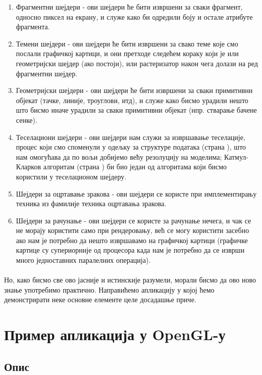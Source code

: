 \documentclass[12pt]{article}
\begin{document}
	\begin{enumerate}
	\item Фрагментни шејдери - ови шејдери ће бити извршени за сваки фрагмент, односно пиксел на екрану, и служе како би одредили боју и остале атрибуте фрагмента.
	\item Темени шејдери - ови шејдери ће бити извршени за свако теме које смо послали графичкој картици, и они претходе следећем кораку који је или геометријски шејдер (ако постоји), или растеризатор након чега долази на ред фрагментни шејдер.
	\item Геометријски шејдери - ови шејдери ће бити извршени за сваки примитивни објекат (тачке, линије, троуглови, итд), и служе како бисмо урадили нешто што бисмо иначе урадили за сваки примитивни објекат (нпр. стварање бачене сенке).
	\item Теселациони шејдери - ови шејдери нам служи за извршавање теселације, процес који смо споменули у одељку за структуре података (страна \pageref{strukturepodatakaproces}), што нам омогућава да по вољи добијемо већу резолуцију на моделима; Катмул-Кларков алгоритам (страна \pageref{katmulklark}) би био један од алгоритама који бисмо користили у теселационом шејдеру.
	\item Шејдери за оцртавање зракова - ови шејдери се користе при имплементирању техника из фамилије техника оцртавања зракова.
	\item Шејдери за рачунање - ови шејдери се користе за рачунање нечега, и чак се не морају користити само при рендеровању, већ се могу користити засебно ако нам је потребно да нешто извршавамо на графичкој картици (графичке картице су супериорније од процесора када нам је потребно да се изврши много једноставних паралелних операција).
	\end{enumerate}
	\paragraph{}
	Но, како бисмо све ово јасније и истинскије разумели, морали бисмо да ово ново знање употребимо практично. Направићемо апликацију у којој ћемо демонстрирати неке основне елементе целе досадашње приче.

	\pagebreak

	\section{Пример апликација у OpenGL-у}
	
	\subsection{Опис}
\end{document}
